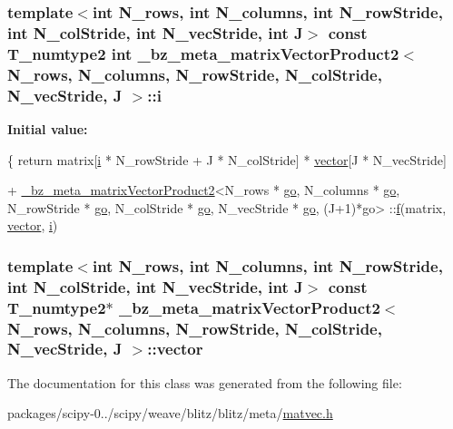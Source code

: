 \subsubsection[{i}]{\setlength{\rightskip}{0pt plus 5cm}template$<$int N\+\_\+rows, int N\+\_\+columns, int N\+\_\+row\+Stride, int N\+\_\+col\+Stride, int N\+\_\+vec\+Stride, int J$>$ const T\+\_\+numtype2 int {\bf \+\_\+bz\+\_\+meta\+\_\+matrix\+Vector\+Product2}$<$ N\+\_\+rows, N\+\_\+columns, N\+\_\+row\+Stride, N\+\_\+col\+Stride, N\+\_\+vec\+Stride, J $>$\+::i}\label{class__bz__meta__matrixVectorProduct2_af9e76b1b2d8678fba66697883bcb937c}
{\bfseries Initial value\+:}
\begin{DoxyCode}
\{
        \textcolor{keywordflow}{return} matrix[\hyperlink{class__bz__meta__matrixVectorProduct2_af9e76b1b2d8678fba66697883bcb937c}{i} * N\_rowStride + J * N\_colStride]
            * \hyperlink{class__bz__meta__matrixVectorProduct2_a8012c4165e3e64a4946e956ab8edbd3a}{vector}[J * N\_vecStride]

            + \hyperlink{class__bz__meta__matrixVectorProduct2}{\_bz\_meta\_matrixVectorProduct2}<N\_rows * 
      \hyperlink{class__bz__meta__matrixVectorProduct2_a3a77c6705adb1cc99578a91786f38389}{go}, N\_columns * \hyperlink{class__bz__meta__matrixVectorProduct2_a3a77c6705adb1cc99578a91786f38389}{go},
                N\_rowStride * \hyperlink{class__bz__meta__matrixVectorProduct2_a3a77c6705adb1cc99578a91786f38389}{go}, N\_colStride * \hyperlink{class__bz__meta__matrixVectorProduct2_a3a77c6705adb1cc99578a91786f38389}{go}, N\_vecStride * \hyperlink{class__bz__meta__matrixVectorProduct2_a3a77c6705adb1cc99578a91786f38389}{go}, (J+1)*go>
                ::\hyperlink{namespacelapack__testing_a1253c46dadde4ab0f214f59fda7810bb}{f}(matrix, \hyperlink{class__bz__meta__matrixVectorProduct2_a8012c4165e3e64a4946e956ab8edbd3a}{vector}, \hyperlink{class__bz__meta__matrixVectorProduct2_af9e76b1b2d8678fba66697883bcb937c}{i})
\end{DoxyCode}
\hypertarget{class__bz__meta__matrixVectorProduct2_a8012c4165e3e64a4946e956ab8edbd3a}{}
\subsubsection[{vector}]{\setlength{\rightskip}{0pt plus 5cm}template$<$int N\+\_\+rows, int N\+\_\+columns, int N\+\_\+row\+Stride, int N\+\_\+col\+Stride, int N\+\_\+vec\+Stride, int J$>$ const T\+\_\+numtype2$\ast$ {\bf \+\_\+bz\+\_\+meta\+\_\+matrix\+Vector\+Product2}$<$ N\+\_\+rows, N\+\_\+columns, N\+\_\+row\+Stride, N\+\_\+col\+Stride, N\+\_\+vec\+Stride, J $>$\+::vector}\label{class__bz__meta__matrixVectorProduct2_a8012c4165e3e64a4946e956ab8edbd3a}


The documentation for this class was generated from the following file\+:\begin{DoxyCompactItemize}
\item 
packages/scipy-\/0../scipy/weave/blitz/blitz/meta/\hyperlink{matvec_8h}{matvec.\+h}\end{DoxyCompactItemize}
